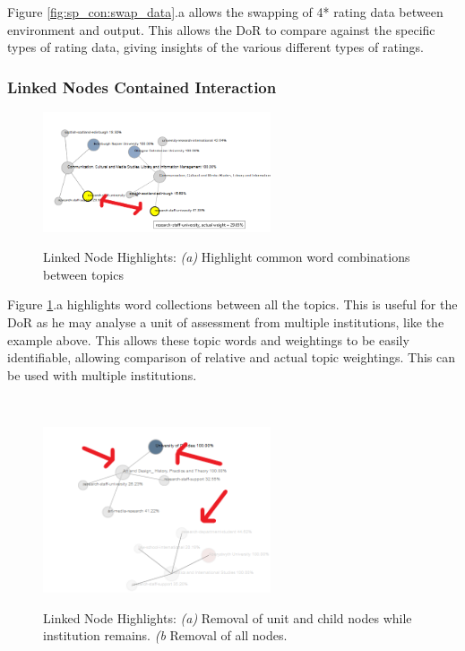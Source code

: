 \documentclass[a4paper, 11pt]{article}
\begin{document}
\noindent Figure \ref{fig:sp_con:swap_data}.a allows the swapping of 4* rating data between environment and output. This allows the DoR to compare against the specific types of rating data, giving insights of the various different types of ratings.


\subsubsection{Linked Nodes Contained Interaction}
\begin{figure}[hbt!]
	\centering
      \includegraphics[width=0.6\textwidth]{imgs/ln_int/topic_weight_highlight.png} \\
	\caption{Linked Node Highlights: 
	\textit{(a)} Highlight common word combinations between topics}
    \label{fig:lp_con:common_topic_words}
     \noindent\makebox[\linewidth]{\rule{\textwidth}{0.4pt}}
\end{figure}

\noindent Figure \ref{fig:lp_con:common_topic_words}.a highlights word collections between all the topics. This is useful for the DoR as he may analyse a unit of assessment from multiple institutions, like the example above. This allows these topic words and weightings to be easily identifiable, allowing comparison of relative and actual topic weightings. This can be used with multiple institutions.

\\

\begin{figure}[hbt!]
	\centering
      \includegraphics[width=0.6\textwidth]{imgs/ln_int/remove_nodes.png} \\
	\caption{Linked Node Highlights: 
	\textit{(a)} Removal of unit and child nodes while institution remains.
	\textit{(b} Removal of all nodes.}
    \label{fig:lp_con:remove_nodes}
     \noindent\makebox[\linewidth]{\rule{\textwidth}{0.4pt}}
\end{figure}
\end{document}
